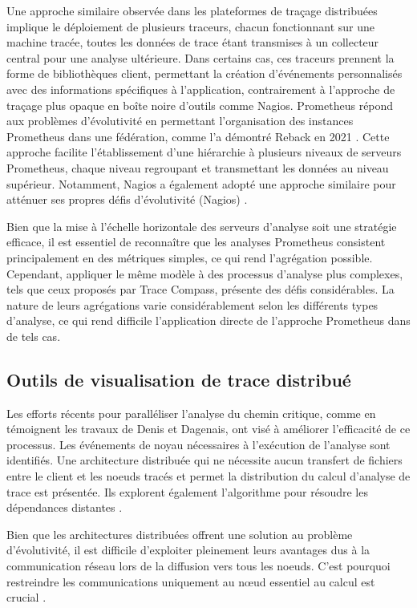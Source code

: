 Une approche similaire observée dans les plateformes de traçage distribuées implique le déploiement de plusieurs traceurs, chacun fonctionnant sur une machine tracée, toutes les données de trace étant transmises à un collecteur central pour une analyse ultérieure. Dans certains cas, ces traceurs prennent la forme de bibliothèques client, permettant la création d'événements personnalisés avec des informations spécifiques à l'application, contrairement à l'approche de traçage plus opaque en boîte noire d'outils comme Nagios. Prometheus répond aux problèmes d'évolutivité en permettant l'organisation des instances Prometheus dans une fédération, comme l'a démontré Reback en 2021 \cite{Logz.io_prometheus_2023}. Cette approche facilite l'établissement d'une hiérarchie à plusieurs niveaux de serveurs Prometheus, chaque niveau regroupant et transmettant les données au niveau supérieur. Notamment, Nagios a également adopté une approche similaire pour atténuer ses propres défis d'évolutivité (Nagios) \cite{Nagios2019}.

Bien que la mise à l'échelle horizontale des serveurs d'analyse soit une stratégie efficace, il est essentiel de reconnaître que les analyses Prometheus consistent principalement en des métriques simples, ce qui rend l'agrégation possible. Cependant, appliquer le même modèle à des processus d'analyse plus complexes, tels que ceux proposés par Trace Compass, présente des défis considérables. La nature de leurs agrégations varie considérablement selon les différents types d'analyse, ce qui rend difficile l'application directe de l'approche Prometheus dans de tels cas.


\subsection{Outils de visualisation de trace distribué}

Les efforts récents pour paralléliser l'analyse du chemin critique, comme en témoignent les travaux de Denis et Dagenais, ont visé à améliorer l'efficacité de ce processus. Les événements de noyau nécessaires à l'exécution de l'analyse sont identifiés. Une architecture distribuée qui ne nécessite aucun transfert de fichiers entre le client et les noeuds tracés et permet la distribution du calcul d'analyse de trace est présentée. Ils explorent également l'algorithme pour résoudre les dépendances distantes \cite{matloff2011programming}.

Bien que les architectures distribuées offrent une solution au problème d'évolutivité, il est difficile d'exploiter pleinement leurs avantages dus à la communication réseau lors de la diffusion vers tous les noeuds. C'est pourquoi restreindre les communications uniquement au nœud essentiel au calcul est crucial \cite{denys2023distributed}.

